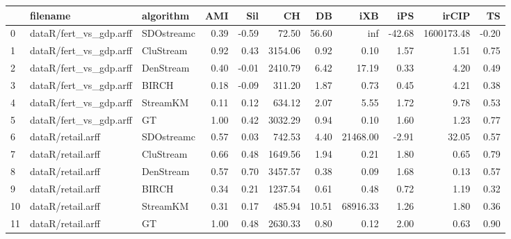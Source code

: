 \begin{tabular}{lllrrrrrrrr}
\toprule
{} &                filename &   algorithm &  AMI &   Sil &      CH &    DB &      iXB &    iPS &      irCIP &    TS \\
\midrule
0  &  dataR/fert\_vs\_gdp.arff &  SDOstreamc & 0.39 & -0.59 &   72.50 & 56.60 &      inf & -42.68 & 1600173.48 & -0.20 \\
1  &  dataR/fert\_vs\_gdp.arff &   CluStream & 0.92 &  0.43 & 3154.06 &  0.92 &     0.10 &   1.57 &       1.51 &  0.75 \\
2  &  dataR/fert\_vs\_gdp.arff &   DenStream & 0.40 & -0.01 & 2410.79 &  6.42 &    17.19 &   0.33 &       4.20 &  0.49 \\
3  &  dataR/fert\_vs\_gdp.arff &       BIRCH & 0.18 & -0.09 &  311.20 &  1.87 &     0.73 &   0.45 &       4.21 &  0.38 \\
4  &  dataR/fert\_vs\_gdp.arff &    StreamKM & 0.11 &  0.12 &  634.12 &  2.07 &     5.55 &   1.72 &       9.78 &  0.53 \\
5  &  dataR/fert\_vs\_gdp.arff &          GT & 1.00 &  0.42 & 3032.29 &  0.94 &     0.10 &   1.60 &       1.23 &  0.77 \\
6  &       dataR/retail.arff &  SDOstreamc & 0.57 &  0.03 &  742.53 &  4.40 & 21468.00 &  -2.91 &      32.05 &  0.57 \\
7  &       dataR/retail.arff &   CluStream & 0.66 &  0.48 & 1649.56 &  1.94 &     0.21 &   1.80 &       0.65 &  0.79 \\
8  &       dataR/retail.arff &   DenStream & 0.57 &  0.70 & 3457.57 &  0.38 &     0.09 &   1.68 &       0.13 &  0.57 \\
9  &       dataR/retail.arff &       BIRCH & 0.34 &  0.21 & 1237.54 &  0.61 &     0.48 &   0.72 &       1.19 &  0.32 \\
10 &       dataR/retail.arff &    StreamKM & 0.31 &  0.17 &  485.94 & 10.51 & 68916.33 &   1.26 &       1.80 &  0.36 \\
11 &       dataR/retail.arff &          GT & 1.00 &  0.48 & 2630.33 &  0.80 &     0.12 &   2.00 &       0.63 &  0.90 \\
\bottomrule
\end{tabular}
